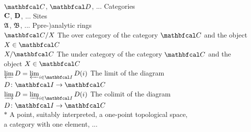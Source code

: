 \begin{tabbing}
	
	
	$\category C$, $\category D$, ... \> Categories\\
	${{\mathbf{C}}}$, ${{\mathbf{D}}}$, ... \> Sites\\
	${\mathfrak{A}}$, ${\mathfrak{B}}$, ... \> Ppre-)analytic rings\\
	
	$\category C/X$ \> The over category of the category $\category C$ and the object $X\in\category C$\\
	$X/\category C$ \> The under category of the category $\category C$ and the object $X\in\category C$\\
	
	$\limit D = \limit_{i\in \category{I}} D(i)$ \> The limit of the diagram $D\colon \category{I}\to \category C$\\
	$\colimit D = \colimit_{i\in \category{I}} D(i)$ \> The colimit of the diagram $D\colon \category{I} \to \category C$\\
		
	$\ast$ \> A point, suitably interpreted, \eg a one-point topological space,\\
	\> a category with one element, ...\\
	
	


\end{tabbing}
